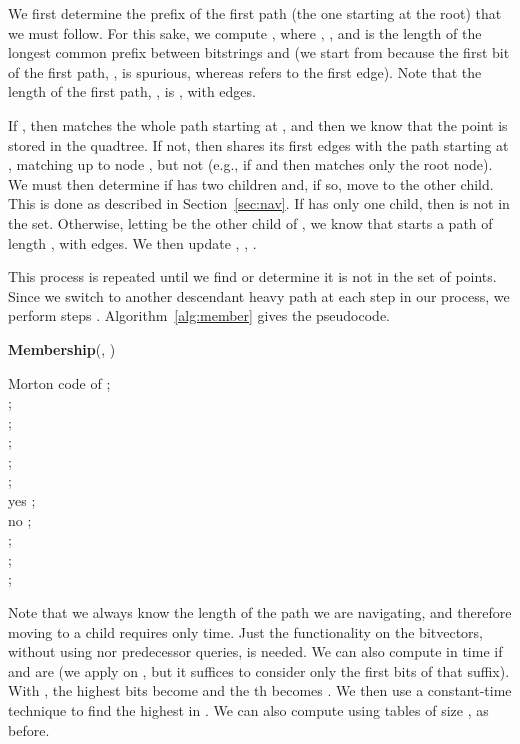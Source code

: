 \documentclass{elsarticle}
\begin{document}
We first determine the prefix of the first path (the one starting at the root) that we must follow. For this sake, we compute , where , , and  is the length of the longest common prefix between bitstrings  and  (we start from  because the first bit of the first path, , is spurious, whereas  refers to the first edge). Note that the length of the first path, , is , with  edges.

If , then  matches the whole path starting at , and then we know that the point is stored in the quadtree. If not, then  shares its first  edges with the path starting at , matching up to node , but not  (e.g., if  and  then  matches only the root node). We must then determine if  has two children and, if so, move to the other child. This is done as described in Section~\ref{sec:nav}.
If  has only one child, then  is not in the set. Otherwise, letting  be the other child of , we know that  starts a path of length , with  edges. We then update , , .

This process is repeated until we find  or determine it is not in the set of points. Since we switch to another descendant heavy path at each step in our process, we perform  steps \cite{ST83}. Algorithm~\ref{alg:member} gives
the pseudocode.

\begin{algorithm}[t]
\caption{{\bf Membership}(, )}
\label{alg:member}

 Morton code of ; \\
; \\
; \\
; \\
; \\
   { ; \\
     \lIf{} {\Return yes}
     ; \\
     \lIf{} {\Return no}
     ; \\
     ; \\
     ; \\
     ;
   }
\end{algorithm}

Note that we always know the length  of the path we are navigating, and therefore moving to a child requires only  time. Just the  functionality on the bitvectors, without using  nor predecessor queries, is needed. We can also compute  in  time if  and  are  (we apply  on , but it suffices to consider only the first  bits of that suffix). With , the  highest bits become  and the th becomes . We then use a constant-time technique to find the highest  in  \cite{Knu09}. We can also compute  using tables of size , as before.
\end{document}
